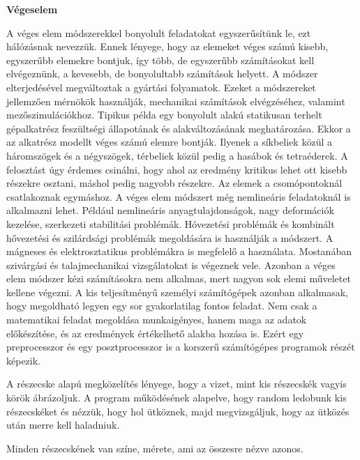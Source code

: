 


\textbf{Végeselem}

A véges elem módszerekkel
bonyolult feladatokat egyszerűsítünk le, ezt hálózásnak nevezzük. Ennek lényege, hogy az elemeket véges számú kisebb, egyszerűbb elemekre bontjuk, így több, de egyszerűbb számításokat kell elvégeznünk, a kevesebb, de bonyolultabb számítások helyett.
A módszer elterjedésével megváltoztak a gyártási folyamatok. Ezeket a módszereket jellemzően mérnökök használják, mechanikai számítások elvégzéséhez, valamint mezőszimulációkhoz. Tipikus példa egy bonyolult alakú statikusan terhelt gépalkatrész feszültségi állapotának és alakváltozásának meghatározása. Ekkor a az alkatrész modellt véges számú elemre bontják. Ilyenek a síkbeliek közül a háromszögek és a négyszögek, térbeliek közül pedig a hasábok és tetraéderek. A felosztást úgy érdemes csinálni, hogy ahol az eredmény kritikus lehet ott kisebb részekre osztani, máshol pedig nagyobb részekre. Az elemek a csomópontoknál csatlakoznak egymáshoz. A véges elem módszert még nemlineáris feladatoknál is alkalmazni lehet. Például nemlineáris anyagtulajdonságok, nagy deformációk kezelése, szerkezeti stabilitási problémák. Hóvezetési problémák és kombinált hővezetési és szilárdsági problémák megoldására is használják a módszert. A mágneses és elektrosztatikus problémákra is megfelelő a használata. Mostanában szivárgási és talajmechanikai vizsgálatokat is végeznek vele. Azonban a véges elem módszer kézi számításokra nem alkalmas, mert nagyon sok elemi műveletet kellene végezni. A kis teljesítményű személyi számítógépek azonban alkalmasak, hogy megoldható legyen egy sor gyakorlatilag fontos feladat. Nem csak a matematikai feladat megoldása munkaigényes, hanem maga az adatok előkészítése, és az eredmények értékelhető alakba hozása is. Ezért egy preprocesszor és egy posztprocesszor is a korszerű számítógépes programok részét képezik.   






A részecske alapú megközelítés lényege, hogy a vizet, mint kis részecskék vagyis körök ábrázoljuk. A program működésének alapelve, hogy random ledobunk kis részecskéket és nézzük, hogy hol ütköznek, majd megvizsgáljuk, hogy az ütközés után merre kell haladniuk. 

Minden részecskének van színe, mérete, ami az összesre nézve azonos. 

